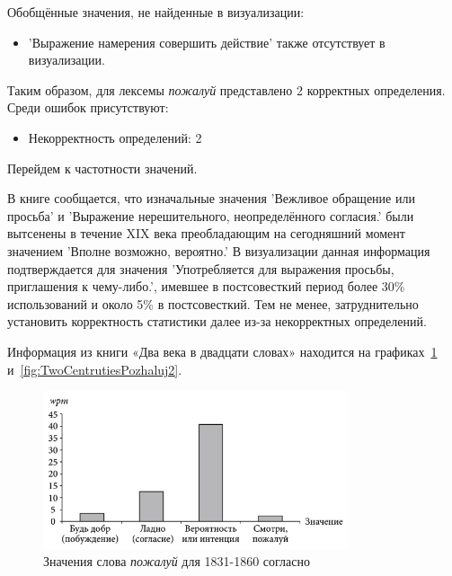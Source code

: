 Обобщённые значения, не найденные в визуализации:
\begin{itemize}
    \item ’Выражение намерения совершить действие’ также отсутствует в визуализации.
\end{itemize}

Таким образом, для лексемы \textit{пожалуй} представлено 2 корректных определения.
Среди ошибок присутствуют:
\begin{itemize}
    \item Некорректность определений: 2
\end{itemize}

Перейдем к частотности значений.

В книге сообщается, что изначальные значения ’Вежливое обращение или просьба’
и ’Выражение нерешительного, неопределённого согласия.’ были вытсенены в течение XIX века
преобладающим на сегодняшний момент значением ’Вполне возможно, вероятно.’
В визуализации данная информация подтверждается для значения
’Употребляется для выражения просьбы, приглашения к чему-либо.’,
имевшее в постсовесткий период более 30\% использований и около 5\% в постсовесткий.
Тем не менее, затруднительно установить корректность статистики далее из-за
некорректных определений.

Информация из книги «Два века в двадцати словах» находится на графиках~\ref{fig:TwoCentrutiesPozhaluj1} и~\ref{fig:TwoCentrutiesPozhaluj2}.

\noindent %
\begin{figure}[H]
    \centering %
    \includegraphics[width=0.8\textwidth]{img/book/pozhaluj/1831-1860}
    \caption{Значения слова \textit{пожалуй} для 1831-1860 согласно~\cite{TwoCenturies}}
    \label{fig:TwoCentrutiesPozhaluj1}
\end{figure}

